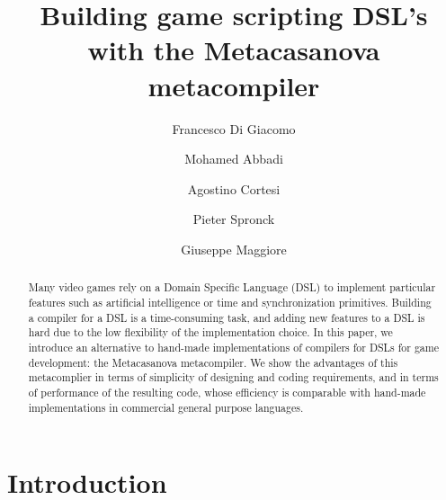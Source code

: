 \documentclass[lnicst]{svmultln}
\begin{document}
%
\mainmatter              %
%
\title{Building game scripting DSL's with the Metacasanova metacompiler}
%
%
\author{Francesco Di Giacomo \and Mohamed Abbadi \and Agostino Cortesi
\and Pieter Spronck
\and Giuseppe Maggiore}
%
%
%

\maketitle              %

\begin{abstract}
	Many video games rely on a Domain Specific Language (DSL) to implement
	particular features such as artificial intelligence or time and
	synchronization primitives.
	Building a compiler for a DSL is a time-consuming task, and adding new
	features to a DSL is hard  due to the low flexibility of the
	implementation choice.
	In this paper, we introduce an alternative to hand-made
	implementations of compilers for DSLs  for game development: the
	Metacasanova metacompiler.
	We show the advantages of this metacomplier  in terms of simplicity of
	designing and coding requirements, and in terms of  performance of the
	resulting code, whose efficiency is comparable with hand-made
	implementations in commercial general purpose languages.
\end{abstract}

\section{Introduction}
\label{sec:introduction}

\end{document}
